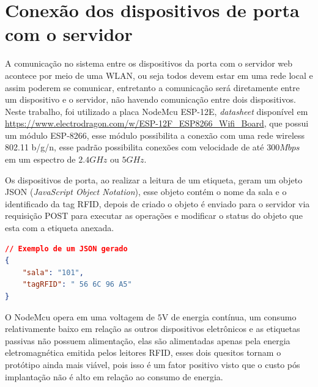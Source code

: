 \section{Conexão dos dispositivos de porta com o servidor}

A comunicação no sistema entre os dispositivos da porta com o servidor web acontece por meio de uma WLAN, ou seja todos devem estar em uma rede local e assim poderem se comunicar, entretanto a comunicação será diretamente entre um dispositivo e o servidor,
não havendo comunicação entre dois dispositivos. Neste trabalho, foi utilizado a placa NodeMcu ESP-12E, \textit{datasheet} disponível em \url{https://www.electrodragon.com/w/ESP-12F_ESP8266_Wifi_Board}, %
que possui um módulo ESP-8266, esse módulo possibilita a conexão com uma rede wireless 802.11 b/g/n, esse padrão possibilita conexões com velocidade de até $300Mbps$ em um espectro de $2.4GHz$ ou $5GHz$. %

\par
Os dispositivos de porta, ao realizar a leitura de um etiqueta, geram um objeto JSON (\textit{JavaScript Object Notation}), esse objeto contém o nome da sala e o identificado da tag RFID, depois de criado o objeto é enviado para o servidor via requisição POST para executar as operações e modificar o status do objeto que esta com a etiqueta anexada.

\begin{lstlisting}[language=json,firstnumber=1]
// Exemplo de um JSON gerado
{
    "sala": "101",
    "tagRFID": " 56 6C 96 A5"
}  
\end{lstlisting}

\par
O NodeMcu opera em uma voltagem de $5$V de energia contínua, um consumo relativamente baixo em relação as outros dispositivos eletrônicos e as etiquetas passivas não possuem alimentação, elas são alimentadas apenas pela energia eletromagnética emitida pelos leitores RFID, esses dois quesitos tornam o protótipo ainda mais viável, pois isso é um fator positivo visto que o custo pós implantação não é alto em relação ao consumo de energia.



